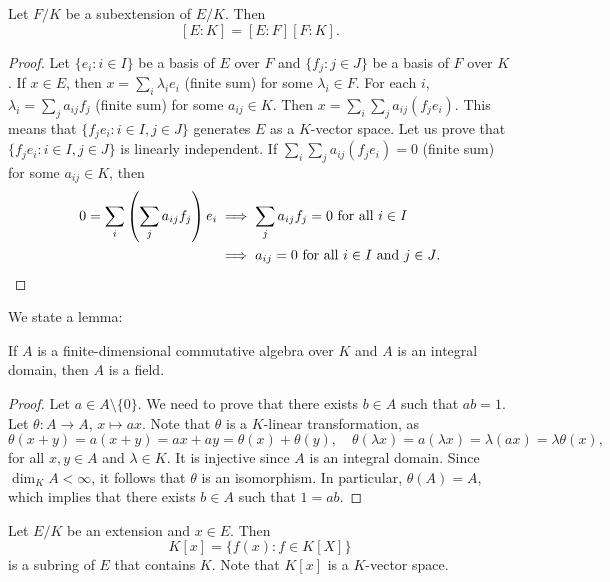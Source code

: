 \begin{proposition}
\label{pro:multiplicativity of degree}
	Let $F/K$ be a subextension of $E/K$. Then
	\[
	[E:K]=[E:F][F:K].
	\]
\end{proposition}

\begin{proof}
	Let $\{e_i:i\in I\}$ be a basis of $E$ over $F$
	and $\{f_j:j\in J\}$ be a basis of $F$ over $K$. If $x\in E$,
	then $x=\sum_i \lambda_ie_i$ (finite sum) 
	for some $\lambda_i\in F$. For each $i$, 
	$\lambda_i=\sum_j a_{ij}f_j$ (finite sum)
	for some $a_{ij}\in K$. Then 
	$x=\sum_i\sum_j a_{ij}(f_je_i)$. This means
	that $\{f_je_i:i\in I,j\in J\}$ generates
	$E$ as a $K$-vector space. Let us prove that 
	$\{f_je_i:i\in I,j\in J\}$
	is linearly independent. If $\sum_i\sum_j a_{ij}(f_je_i)=0$ (finite sum)
	for some $a_{ij}\in K$, 
	then
	\begin{align*}
		0=\sum_i\left(\sum_j a_{ij}f_j\right)e_i&\implies
		\sum_j a_{ij}f_j=0\text{ for all $i\in I$}\\
		&\implies 
		a_{ij}=0\text{ for all $i\in I$ and $j\in J$}.\qedhere
	\end{align*}
\end{proof}

We state a lemma:

\begin{lemma}
If $A$ is a finite-dimensional commutative algebra over $K$ 
and $A$ is an integral domain, then $A$ is a field. 
\end{lemma}

\begin{proof}
	Let $a\in A\setminus\{0\}$. We need to prove that there exists $b\in A$
	such that $ab=1$. Let $\theta\colon A\to A$, $x\mapsto ax$. Note that 
	$\theta$ is a $K$-linear transformation, as 
    \[
    \theta(x+y)=a(x+y)=ax+ay=\theta(x)+\theta(y),\quad
    \theta(\lambda x)=a(\lambda x)=\lambda (ax)=\lambda\theta(x),
    \]
    for all $x,y\in A$ and $\lambda\in K$. 
 It is injective since $A$ is an
	integral domain.  Since $\dim_KA<\infty$, it follows that $\theta$ is an
	isomorphism. In particular, $\theta(A)=A$, which implies that there exists
	$b\in A$ such that $1=ab$. 
\end{proof}

Let $E/K$ be an extension and $x\in E$. 
Then 
\[
K[x]=\{f(x): f\in K[X]\}
\]
is a subring of $E$ that contains $K$. Note that 
$K[x]$ is a $K$-vector space. 

